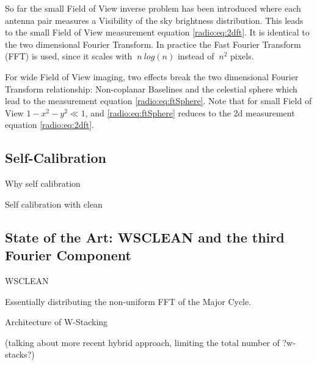 So far the small Field of View inverse problem has been introduced where each antenna pair measures a Visibility of the sky brightness distribution. This leads to the small Field of View measurement equation \eqref{radio:eq:2dft}. It is identical to the two dimensional Fourier Transform. In practice the Fast Fourier Transform (FFT) is used, since it scales with $~n\:log(n)$ instead of $~n^2$ pixels.



For wide Field of View imaging, two effects break the two dimensional Fourier Transform relationship: Non-coplanar Baselines and the celestial sphere which lead to the measurement equation \eqref{radio:eq:ftSphere}. Note that for small Field of View $1 - x^2 -y ^2 \ll 1$, and \eqref{radio:eq:ftSphere} reduces to the 2d measurement equation \eqref{radio:eq:2dft}.



\subsection{Self-Calibration}
Why self calibration

Self calibration with clean




\subsection{State of the Art: WSCLEAN and the third Fourier Component} 

\cite{offringa2014wsclean} WSCLEAN

Essentially distributing the non-uniform FFT of the Major Cycle.

Architecture of W-Stacking

(talking about more recent hybrid approach, limiting the total number of ?w-stacks?)







